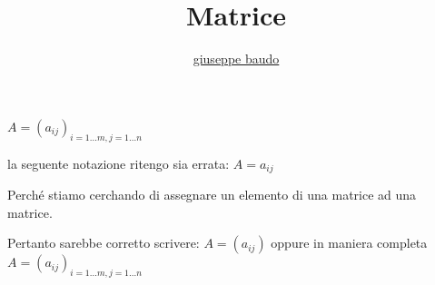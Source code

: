 \documentclass[a4paper,10pt]{article}
\title{Matrice}
\author{\href{http://www.baudo.hol.es}{giuseppe baudo}}
\begin{document}
\maketitle

$A = (a_{ij})_{i=1...m,j=1...n}$

la seguente notazione ritengo sia errata:
$A = a_{ij}$

Perch\'{e} stiamo cerchando di assegnare un elemento di una matrice ad una matrice.

Pertanto sarebbe corretto scrivere: $A = (a_{ij})$ oppure in maniera completa $A = (a_{ij})_{i=1...m,j=1...n}$
\end{document}
